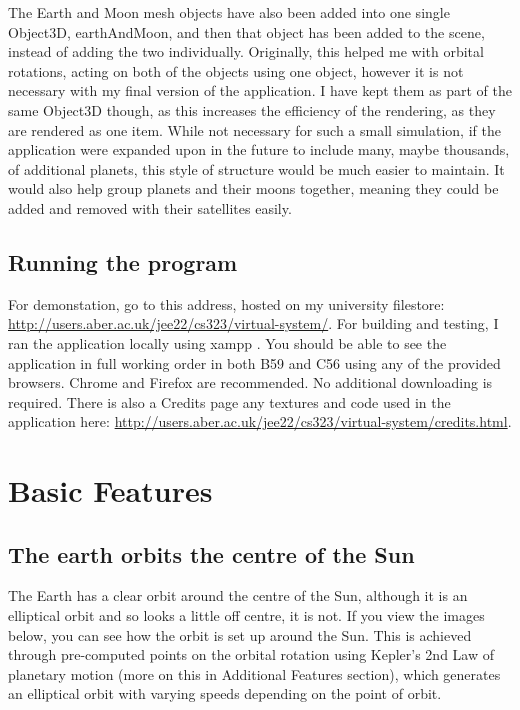 \documentclass[12pt]{article}
\begin{document}
The Earth and Moon mesh objects have also been added into one single Object3D, earthAndMoon, and then that object has been added to the scene, instead of adding the two individually. Originally, this helped me with orbital rotations, acting on both of the objects using one object, however it is not necessary with my final version of the application. I have kept them as part of the same Object3D though, as this increases the efficiency of the rendering, as they are rendered as one item. While not necessary for such a small simulation, if the application were expanded upon in the future to include many, maybe thousands, of additional planets, this style of structure would be much easier to maintain. It would also help group planets and their moons together, meaning they could be added and removed with their satellites easily.

\subsection{Running the program}
For demonstation, go to this address, hosted on my university filestore: \url{http://users.aber.ac.uk/jee22/cs323/virtual-system/}. For building and testing, I ran the application locally using xampp\cite{xampp} . You should be able to see the application in full working order in both B59 and C56 using any of the provided browsers. Chrome and Firefox are recommended. No additional downloading is required. There is also a Credits page any textures and code used in the application here: \url{http://users.aber.ac.uk/jee22/cs323/virtual-system/credits.html}.



\section{Basic Features}
\subsection{The earth orbits the centre of the Sun}
The Earth has a clear orbit around the centre of the Sun, although it is an elliptical orbit and so looks a little off centre, it is not. If you view the images below, you can see how the orbit is set up around the Sun. This is achieved through pre-computed points on the orbital rotation using Kepler's 2nd Law of planetary motion (more on this in Additional Features section), which generates an elliptical orbit with varying speeds depending on the point of orbit.
\end{document}
